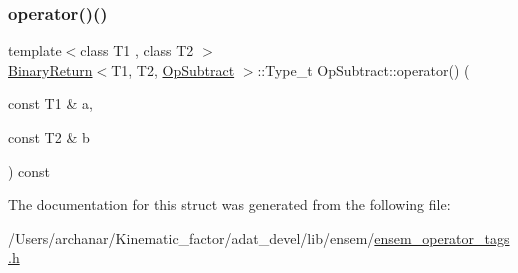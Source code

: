 \mbox{\label{structOpSubtract_a977cd29c1df947e7958b86dd98eee321}} 
\subsubsection{\texorpdfstring{operator()()}{operator()()}\hspace{0.1cm}{\footnotesize\ttfamily [2/2]}}
{\footnotesize\ttfamily template$<$class T1 , class T2 $>$ \\
\mbox{\hyperlink{structBinaryReturn}{Binary\+Return}}$<$T1, T2, \mbox{\hyperlink{structOpSubtract}{Op\+Subtract}} $>$\+::Type\+\_\+t Op\+Subtract\+::operator() (\begin{DoxyParamCaption}\item[{const T1 \&}]{a,  }\item[{const T2 \&}]{b }\end{DoxyParamCaption}) const\hspace{0.3cm}{\ttfamily [inline]}}



The documentation for this struct was generated from the following file\+:\begin{DoxyCompactItemize}
\item 
/\+Users/archanar/\+Kinematic\+\_\+factor/adat\+\_\+devel/lib/ensem/\mbox{\hyperlink{lib_2ensem_2ensem__operator__tags_8h}{ensem\+\_\+operator\+\_\+tags.\+h}}\end{DoxyCompactItemize}
